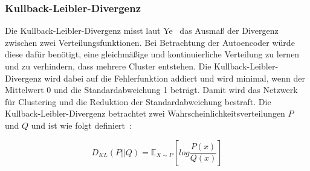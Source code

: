 \subsubsection*{Kullback-Leibler-Divergenz}
\label{subsubsec:kldiv}
Die Kullback-Leibler-Divergenz misst laut Ye~\cite[S. 180]{yeVersatilityAutoencoders2022} das Ausmaß der Divergenz zwischen zwei Verteilungsfunktionen. Bei Betrachtung der Autoencoder würde diese dafür benötigt, eine gleichmäßige und kontinuierliche Verteilung zu lernen und zu verhindern, dass mehrere Cluster entstehen. Die Kullback-Leibler-Divergenz wird dabei auf die Fehlerfunktion addiert und wird minimal, wenn der Mittelwert 0 und die Standardabweichung 1 beträgt. Damit wird das Netzwerk für Clustering und die Reduktion der Standardabweichung bestraft. Die Kullback-Leibler-Divergenz betrachtet zwei Wahrscheinlichkeitsverteilungen $P$ und $Q$ und ist wie folgt definiert~\cite[S. 80]{goodfellowDeepLearningUmfassende2018}:

\begin{equation}
    D_{KL} (P || Q) = \mathbb{E}_{X \sim P} [log \frac{P(x)}{Q(x)}]
\end{equation}

